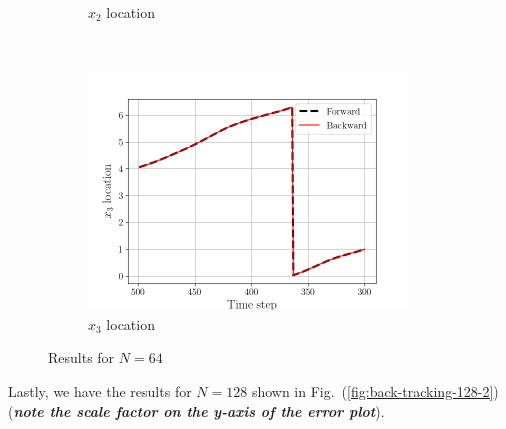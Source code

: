 \begin{figure}[H]
\begin{subfigure}[H]{0.45\textwidth}
        \caption{$x_{2}$ location}
    \end{subfigure}
    ~
    \begin{subfigure}[H]{0.45\textwidth}
        \includegraphics[height=2.5in]{media/rk4/run-64/x3-64-tracking-2.png}
        \caption{$x_{3}$ location}
    \end{subfigure}
    \caption{Results for $N=64$}
    \label{fig:back-tracking-64-2}
\end{figure}
\newpage
Lastly, we have the results for $N=128$ shown in
Fig.~(\ref{fig:back-tracking-128-2}) (\emph{\textbf{note the scale factor on the
y-axis of the error plot}}).
